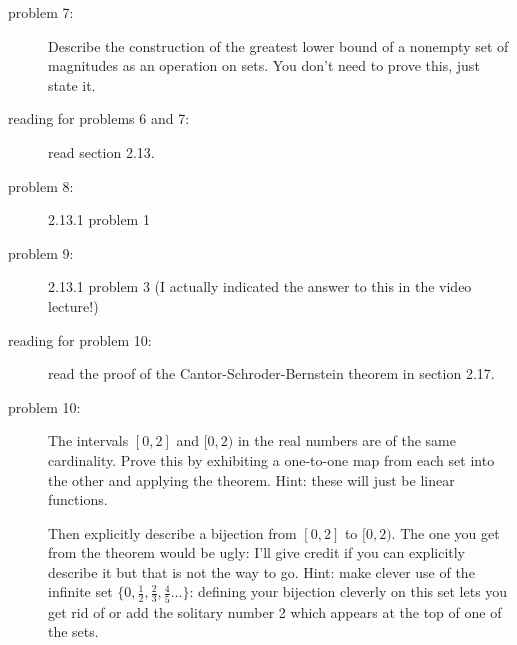 \documentclass[12pt]{article}
\begin{document}
\begin{description}
\item[problem 7:]  Describe the construction of the greatest lower bound of a nonempty set of magnitudes as an operation on sets.  You don't need to prove this, just state it.


\item[reading for problems 6 and 7:]  read section 2.13.

\item[problem 8:] 2.13.1 problem 1

\item[problem 9:]   2.13.1 problem 3 (I actually indicated the answer to this in the video lecture!)

\item[reading for problem 10:]  read the proof of the Cantor-Schroder-Bernstein theorem in section 2.17.

\item[problem 10:]  The intervals $[0,2]$ and $[0,2)$ in the real numbers are of the same cardinality.  Prove this by exhibiting a one-to-one map from each set into the other
and applying the theorem.  Hint:  these will just be linear functions.

Then explicitly describe a bijection from $[0,2]$ to $[0,2)$.  The one you get from the theorem would be ugly:  I'll give credit if you can explicitly describe it but that is not the way to go.
Hint: make clever use of the infinite set $\{0,\frac12, \frac 23, \frac 45\ldots\}$:  defining your bijection cleverly on this set lets you get rid of or add the solitary number 2 which appears at the top of one of the sets.

\end{description}
\end{document}
